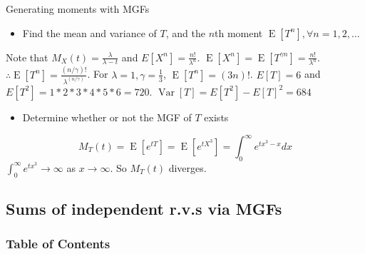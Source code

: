 \documentclass[8pt]{beamer}
\newcommand{\expec}[1]{\operatorname{E}\left[ #1 \right]}
\newcommand{\myvar}[1]{\operatorname{Var}\left[#1\right]}
\begin{document}
\begin{frame}{Generating moments with MGFs}
    \begin{itemize}
        \item Find the mean and variance of $T$, and the $n$th moment $\expec{T^n}, \forall n = 1,2,\dots$
    \end{itemize}

    Note that $M_X(t) = \frac{\lambda}{\lambda - t}$ and $E[X^n] = \frac{n!}{\lambda^n}$. $\expec{X^n} = \expec{T^{\gamma n}} = \frac{n!}{\lambda^n}$.
    $\therefore \expec{T^n} = \frac{(n/\gamma)!}{\lambda^{(n /\gamma)}}$.
    For $\lambda = 1, \gamma = \frac{1}{3}$, $\expec{T^n} = (3n)!$. $E[T] = 6$ and $E[T^2] = 1*2*3*4*5*6 = 720$. $\myvar{T} = E[T^2] - E[T]^2 = 684$

    \begin{itemize}
        \item Determine whether or not the MGF of $T$ exists
    \end{itemize}

    \[
        M_T(t) = \expec{e^{tT}} = \expec{e^{tX^3}} = \int_0^\infty e^{tx^3 - x} dx
    \]
    $\int_0^\infty e^{tx^3} \rightarrow \infty$ as $x \rightarrow \infty$. So $M_T(t)$ diverges.

\end{frame}

\subsection{Sums of independent r.v.s via MGFs}

\begin{frame}
    \frametitle{Table of Contents}
    \tableofcontents[currentsubsection]
\end{frame}
\end{document}
